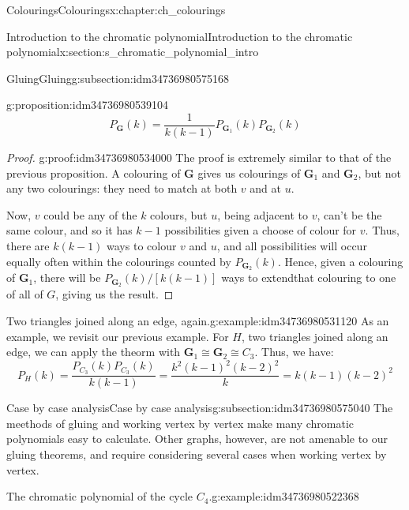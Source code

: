 \documentclass[oneside,10pt,]{book}
\numberwithin{equation}{section}
\newcommand{\bfG}{\mathbf{G}}
\begin{document}
\begin{chapterptx}{Colourings}{}{Colourings}{}{}{x:chapter:ch_colourings}
\begin{sectionptx}{Introduction to the chromatic polynomial}{}{Introduction to the chromatic polynomial}{}{}{x:section:s_chromatic_polynomial_intro}
\begin{subsectionptx}{Gluing}{}{Gluing}{}{}{g:subsection:idm34736980575168}
\begin{proposition}{}{}{g:proposition:idm34736980539104}
%
\begin{equation*}
P_{\bfG}(k)=\frac{1}{k(k-1)}P_{\bfG_1}(k)P_{\bfG_2}(k)
\end{equation*}
\end{proposition}
\begin{proof}{}{g:proof:idm34736980534000}
The proof is extremely similar to that of the previous proposition.  A colouring of \(\bfG\) gives us colourings of \(\bfG_1\) and \(\bfG_2\), but not any two colourings: they need to match at both \(v\) and at \(u\).%
\par
Now, \(v\) could be any of the \(k\) colours, but \(u\), being adjacent to \(v\), can't be the same colour, and so it has \(k-1\) possibilities given a choose of colour for \(v\).  Thus, there are \(k(k-1)\) ways to colour \(v\) and \(u\), and all possibilities will occur equally often within the colourings counted by \(P_{\bfG_2}(k)\).  Hence, given a colouring of \(\bfG_1\), there will be \(P_{\bfG_2}(k)/[k(k-1)]\) ways to extendthat colouring to one of all of \(G\), giving us the result.%
\end{proof}
\begin{example}{Two triangles joined along an edge, again.}{g:example:idm34736980531120}%
As an example, we revisit our previous example.  For \(H\), two triangles joined along an edge, we can apply the theorm with \(\bfG_1\cong \bfG_2\cong C_3\).  Thus, we have:%
%
\begin{equation*}
P_H(k)=\frac{P_{C_3}(k)P_{C_3}(k)}{k(k-1)}=\frac{k^2(k-1)^2(k-2)^2}{k}=k(k-1)(k-2)^2
\end{equation*}
\end{example}
\end{subsectionptx}
%
%
\typeout{************************************************}
\typeout{************************************************}
%
\begin{subsectionptx}{Case by case analysis}{}{Case by case analysis}{}{}{g:subsection:idm34736980575040}
The meethods of gluing and working vertex by vertex make many chromatic polynomials easy to calculate.  Other graphs, however, are not amenable to our gluing theorems, and require considering several cases when working vertex by vertex.%
\begin{example}{The chromatic polynomial of the cycle \(C_4\).}{g:example:idm34736980522368}%
\begin{sidebyside}{2}{0.025}{0.025}{0.05}%
\begin{sbspanel}{0.6}%

\end{sbspanel}
\end{sidebyside}
\end{example}
\end{subsectionptx}
\end{sectionptx}
\end{chapterptx}
\end{document}
